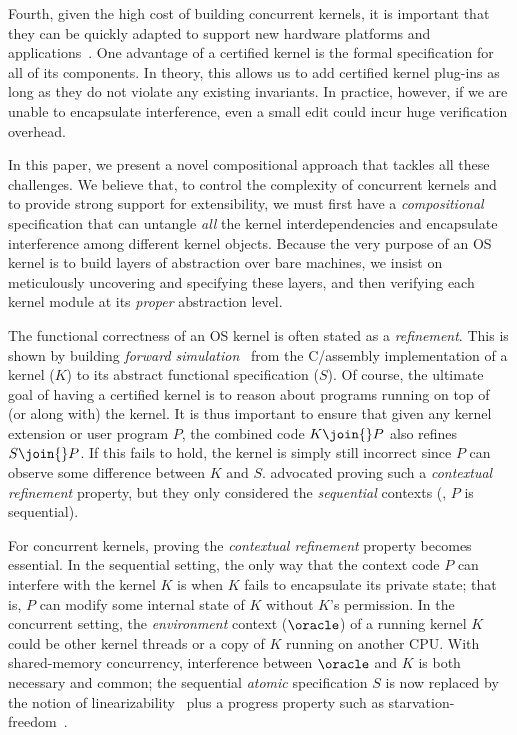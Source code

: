 Fourth, given the high cost of building concurrent kernels, it is
important that they can be quickly adapted to support new hardware
platforms and applications~\cite{dune12,unikernel13,engler95}.  One
advantage of a certified kernel is the formal specification for all of
its components. In theory, this allows us to add certified kernel
plug-ins as long as they do not violate any existing invariants.  In
practice, however, if we are unable to encapsulate interference, even
a small edit could incur huge verification overhead.

In this paper, we present a novel compositional approach that tackles
all these challenges. We believe that, to control the complexity of
concurrent kernels and to provide strong support for extensibility, we
must first have a {\em compositional} specification that can untangle
{\em all} the kernel interdependencies and encapsulate interference
among different kernel objects. Because the very purpose of an OS
kernel is to build layers of abstraction over bare machines, we insist
on meticulously uncovering and specifying these layers, and then
verifying each kernel module at its {\em proper} abstraction level.

The functional correctness of an OS kernel is often stated as a {\em
  refinement}.  This is shown by building {\em forward
  simulation}~\cite{Lynch95} from the C/assembly implementation of a
kernel ($K$) to its abstract functional specification ($S$). Of
course, the ultimate goal of having a certified kernel is to reason
about programs running on top of (or along with) the kernel. It is
thus important to ensure that given any kernel extension or user
program $P$, the combined code $K\join{}P$ also refines
$S\join{}P$. If this fails to hold, the kernel is simply still
incorrect since $P$ can observe some difference between $K$ and $S$.
\citet{dscal15} advocated proving such a {\em contextual refinement}
property, but they only considered the {\em sequential} contexts (\ie,
$P$ is sequential).

For concurrent kernels, proving the {\em contextual refinement}
property becomes essential. In the sequential setting, the only way
that the context code $P$ can interfere with the kernel $K$ is when
$K$ fails to encapsulate its private state; that is, $P$ can
modify some internal state of $K$ without $K$'s permission.
In the concurrent setting, the {\em environment} context ($\oracle$)
of a running kernel $K$ could be other kernel threads or a copy of $K$
running on another CPU. With shared-memory concurrency, 
interference between $\oracle$ and $K$ is both necessary and 
common; the sequential {\em atomic} specification $S$ is now replaced
by the notion of linearizability~\cite{herlihy90} plus a progress
property such as starvation-freedom~\cite{Herlihy08book}.

